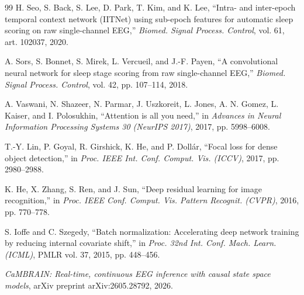 \documentclass[conference]{IEEEtran}
\begin{document}
\begin{thebibliography}{99}
 H. Seo, S. Back, S. Lee, D. Park, T. Kim, and K. Lee, ``Intra- and inter-epoch
temporal context network (IITNet) using sub-epoch features for automatic sleep scoring on raw
single-channel EEG,'' \emph{Biomed. Signal Process. Control}, vol. 61, art. 102037, 2020.

 A. Sors, S. Bonnet, S. Mirek, L. Vercueil, and J.-F. Payen, ``A convolutional neural
network for sleep stage scoring from raw single-channel EEG,'' \emph{Biomed. Signal Process.
Control}, vol. 42, pp. 107--114, 2018.

 A. Vaswani, N. Shazeer, N. Parmar, J. Uszkoreit, L. Jones, A. N. Gomez,
L. Kaiser, and I. Polosukhin, ``Attention is all you need,'' in \emph{Advances in Neural Information
Processing Systems 30 (NeurIPS 2017)}, 2017, pp. 5998--6008.

 T.-Y. Lin, P. Goyal, R. Girshick, K. He, and P. Doll\'ar, ``Focal loss for dense
object detection,'' in \emph{Proc. IEEE Int. Conf. Comput. Vis. (ICCV)}, 2017, pp. 2980--2988.

 K. He, X. Zhang, S. Ren, and J. Sun, ``Deep residual learning for image
recognition,'' in \emph{Proc. IEEE Conf. Comput. Vis. Pattern Recognit. (CVPR)}, 2016, pp. 770--778.

 S. Ioffe and C. Szegedy, ``Batch normalization: Accelerating deep network
training by reducing internal covariate shift,'' in \emph{Proc. 32nd Int. Conf. Mach. Learn. (ICML)},
PMLR vol. 37, 2015, pp. 448--456.

 \emph{CaMBRAIN: Real-time, continuous EEG inference with causal state space
models}, arXiv preprint arXiv:2605.28792, 2026.

\end{thebibliography}
\end{document}
